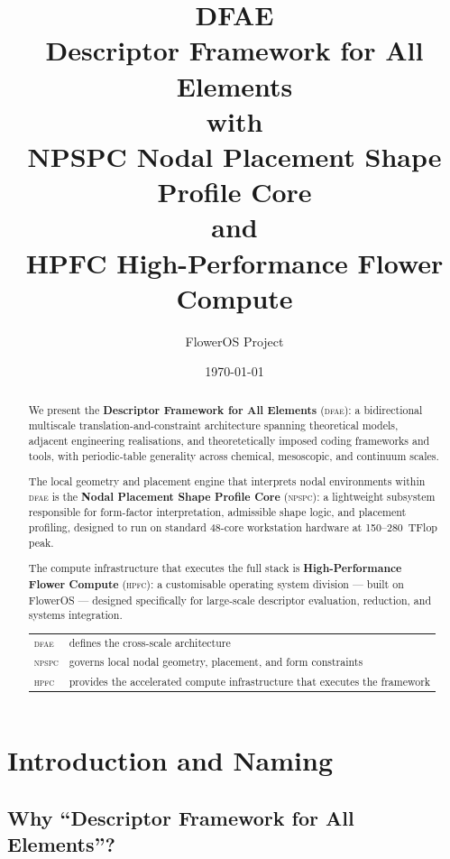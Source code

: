 \documentclass[11pt,a4paper]{article}
\title{%
  \textbf{DFAE} \\[4pt]
  \Large Descriptor Framework for All Elements \\[14pt]
  \normalsize with \\[6pt]
  \textbf{NPSPC} \quad \large Nodal Placement Shape Profile Core \\[6pt]
  \normalsize and \\[6pt]
  \textbf{HPFC} \quad \large High-Performance Flower Compute%
}
\author{FlowerOS Project}
\date{\today}
\theoremstyle{definition}
\theoremstyle{plain}
\newcommand{\DFAE}{\textsc{dfae}}
\newcommand{\NPSPC}{\textsc{npspc}}
\newcommand{\HPFC}{\textsc{hpfc}}
\begin{document}
\maketitle
\thispagestyle{empty}

\begin{abstract}
\noindent
We present the \textbf{Descriptor Framework for All Elements} (\DFAE{}):
a bidirectional multiscale translation-and-constraint architecture
spanning theoretical models, adjacent engineering realisations, and
theoretetically imposed coding frameworks and tools, with
periodic-table generality across chemical, mesoscopic, and continuum
scales.

The local geometry and placement engine that interprets nodal
environments within \DFAE{} is the
\textbf{Nodal Placement Shape Profile Core} (\NPSPC{}):
a lightweight subsystem responsible for form-factor interpretation,
admissible shape logic, and placement profiling, designed to run
on standard 48-core workstation hardware at 150--280~TFlop peak.

The compute infrastructure that executes the full stack is
\textbf{High-Performance Flower Compute} (\HPFC{}):
a customisable operating system division --- built on FlowerOS ---
designed specifically for large-scale descriptor evaluation,
reduction, and systems integration.

\bigskip
\begin{center}
\begin{tabular}{@{}ll@{}}
\toprule
\DFAE{} & defines the cross-scale architecture \\
\NPSPC{} & governs local nodal geometry, placement, and form constraints \\
\HPFC{} & provides the accelerated compute infrastructure that executes the framework \\
\bottomrule
\end{tabular}
\end{center}
\end{abstract}

\tableofcontents
\newpage

\section{Introduction and Naming}
\label{sec:intro}

\subsection{Why ``Descriptor Framework for All Elements''?}
\end{document}
